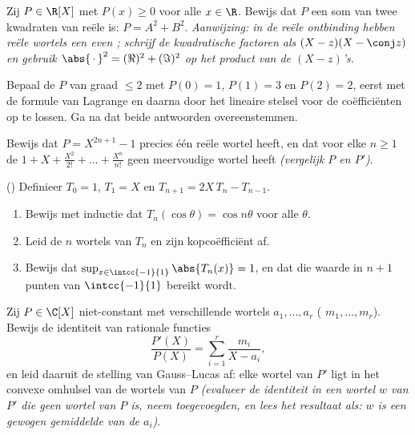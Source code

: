 \begin{exercise}[$\star\star$]\label{exo:b1:poly:7}
Zij $P \in \R[X]$ met $P(x) \geq 0$ voor alle $x \in \R$. Bewijs dat $P$
een som van twee kwadraten van reële  is: $P = A^2 + B^2$.
\emph{Aanwijzing: in de reële ontbinding hebben reële wortels een even
; schrijf de kwadratische factoren als $(X - z)(X - \conj
z)$ en gebruik $\abs{\,\cdot\,}^2 = (\Re)^2 + (\Im)^2$ op het product van
de $(X - z)$'s.}
\end{exercise}

\begin{exercise}[$\star\star$]\label{exo:b1:poly:8}
Bepaal de  $P$ van graad $\leq 2$ met $P(0) = 1$, $P(1) = 3$ en
$P(2) = 2$, eerst met de formule van Lagrange en daarna door het lineaire
stelsel voor de coëfficiënten op te lossen. Ga na dat beide antwoorden
overeenstemmen.
\end{exercise}

\begin{exercise}[$\star\star$]\label{exo:b1:poly:9}
Bewijs dat $P = X^{2n+1} - 1$ precies één reële wortel heeft, en dat voor
elke $n \geq 1$ de  $1 + X + \frac{X^2}{2!} + \dots +
\frac{X^n}{n!}$ geen meervoudige wortel heeft \emph{(vergelijk $P$ en
$P'$)}.
\end{exercise}

\begin{exercise}[$\star\star\star$]\label{exo:b1:poly:10}
() Definieer $T_0 = 1$, $T_1 = X$ en $T_{n+1} =
2X\,T_n - T_{n-1}$.
\begin{enumerate}
  \item Bewijs met inductie dat $T_n(\cos\theta) = \cos n\theta$ voor
        alle $\theta$.
  \item Leid de $n$ wortels van $T_n$ en zijn kopcoëfficiënt af.
  \item Bewijs dat $\sup_{x \in \intcc{-1}{1}} \abs{T_n(x)} = 1$, en dat
        die waarde in $n + 1$ punten van $\intcc{-1}{1}$ bereikt wordt.
\end{enumerate}
\end{exercise}

\begin{exercise}[$\star\star\star$]\label{exo:b1:poly:11}
Zij $P \in \C[X]$ niet-constant met verschillende wortels $a_1, \dots,
a_r$ ( $m_1, \dots, m_r$). Bewijs de identiteit van
rationale functies
\[
\frac{P'(X)}{P(X)} = \sum_{i=1}^{r} \frac{m_i}{X - a_i},
\]
en leid daaruit de stelling van Gauss--Lucas af: elke wortel van $P'$
ligt in het convexe omhulsel van de wortels van $P$ \emph{(evalueer de
identiteit in een wortel $w$ van $P'$ die geen wortel van $P$ is, neem
toegevoegden, en lees het resultaat als: $w$ is een gewogen gemiddelde van
de $a_i$)}.
\end{exercise}

